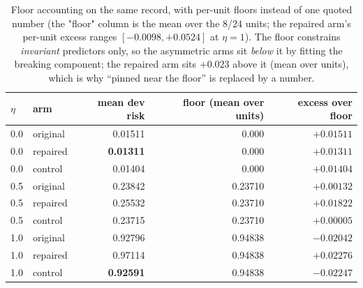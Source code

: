 \documentclass[11pt]{article}
\begin{document}
\begin{table}[t]
\centering
\caption{Floor accounting on the same record, with per-unit floors instead of one quoted
number (the "floor" column is the mean over the $8$/$24$ units; the repaired arm's per-unit
excess ranges $[-0.0098,+0.0524]$ at $\eta{=}1$). The floor constrains \emph{invariant}
predictors only, so the asymmetric arms sit
\emph{below} it by fitting the breaking component; the repaired arm sits $+0.023$ above it
(mean over units), which is why ``pinned near the floor'' is replaced by a number.}
\label{tab:floors}
\small
\begin{tabular}{@{}llrrr@{}}
\toprule
$\eta$ & arm & mean dev risk & floor (mean over units) & excess over floor \\
\midrule
0.0 & original & 0.01511 & 0.000 & $+0.01511$ \\
0.0 & repaired & \textbf{0.01311} & 0.000 & $+0.01311$ \\
0.0 & control  & 0.01404 & 0.000 & $+0.01404$ \\
\midrule
0.5 & original & 0.23842 & 0.23710 & $+0.00132$ \\
0.5 & repaired & 0.25532 & 0.23710 & $+0.01822$ \\
0.5 & control  & 0.23715 & 0.23710 & $+0.00005$ \\
\midrule
1.0 & original & 0.92796 & 0.94838 & $-0.02042$ \\
1.0 & repaired & 0.97114 & 0.94838 & $\mathbf{+0.02276}$ \\
1.0 & control  & \textbf{0.92591} & 0.94838 & $-0.02247$ \\
\bottomrule
\end{tabular}
\end{table}
\end{document}
